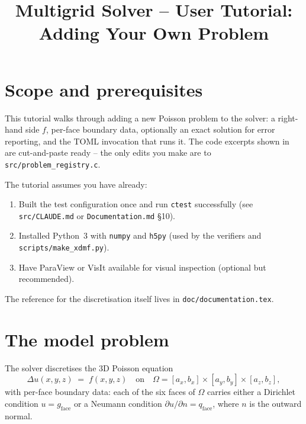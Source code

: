 \documentclass[11pt]{article}
\title{Multigrid Solver -- User Tutorial:\\ Adding Your Own Problem}
\author{}
\date{}
\begin{document}
\maketitle

\section{Scope and prerequisites}

This tutorial walks through adding a new Poisson problem to the
solver: a right-hand side $f$, per-face boundary data, optionally an
exact solution for error reporting, and the TOML invocation that
runs it.  The code excerpts shown in 
are cut-and-paste ready -- the only edits you make are to
\texttt{src/problem\_registry.c}.

The tutorial assumes you have already:
\begin{enumerate}
\item Built the test configuration once and run \texttt{ctest}
      successfully (see \texttt{src/CLAUDE.md} or
      \texttt{Documentation.md} \S 10).
\item Installed Python~3 with \texttt{numpy} and \texttt{h5py} (used
      by the verifiers and \texttt{scripts/make\_xdmf.py}).
\item Have ParaView or VisIt available for visual inspection (optional
      but recommended).
\end{enumerate}

The reference for the discretisation itself lives in
\texttt{doc/documentation.tex}.

\section{The model problem}\label{sec:model}

The solver discretises the 3D Poisson equation
\begin{equation}
  \Delta u(x,y,z) \;=\; f(x,y,z)
  \quad\text{on}\quad
  \Omega = [a_x, b_x] \times [a_y, b_y] \times [a_z, b_z],
  \label{eq:poisson}
\end{equation}
with per-face boundary data: each of the six faces of $\Omega$
carries either a Dirichlet condition $u = g_{\text{face}}$ or a
Neumann condition $\partial u / \partial n = q_{\text{face}}$, where
$n$ is the outward normal.
\end{document}
